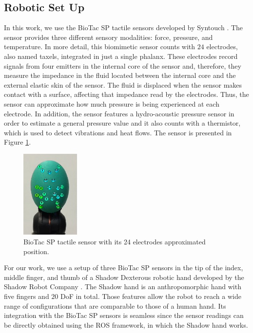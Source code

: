 \subsection{Robotic Set Up}
\label{cha:tactile:sec:tactilegcn:subsec:rpobotic-set-up}

In this work, we use the BioTac SP tactile sensors developed by Syntouch \cite{Syntouch2018}. The sensor provides three different sensory modalities: force, pressure, and temperature. In more detail, this biomimetic sensor counts with $24$ electrodes, also named taxels, integrated in just a single phalanx. These electrodes record signals from four emitters in the internal core of the sensor and, therefore, they measure the impedance in the fluid located between the internal core and the external elastic skin of the sensor. The fluid is displaced when the sensor makes contact with a surface, affecting that impedance read by the electrodes. Thus, the sensor can approximate how much pressure is being experienced at each electrode. In addition, the sensor features a hydro-acoustic pressure sensor in order to estimate a general pressure value and it also counts with a thermistor, which is used to detect vibrations and heat flows. The sensor is presented in Figure \ref{fig:biotac-sensor}.

\begin{figure}[!htb]
	\centering
	\includegraphics[width = 0.26\textwidth, clip = true, trim = 0 75 0 20]{Figures/Tactile/biotac-sensor.png}
	\caption{BioTac SP tactile sensor with its 24 electrodes approximated position.}
	\label{fig:biotac-sensor}
\end{figure}

For our work, we use a setup of three BioTac SP sensors in the tip of the index, middle finger, and thumb of a Shadow Dexterous robotic hand developed by the Shadow Robot Company \cite{ShadowRobotCompany2018}. The Shadow hand is an anthropomorphic hand with five fingers and $20$ \ac{DoF} in total. Those features allow the robot to reach a wide range of configurations that are comparable to those of a human hand. Its integration with the BioTac SP sensors is seamless since the sensor readings can be directly obtained using the \ac{ROS} \cite{Quigley2009} framework, in which the Shadow hand works.

